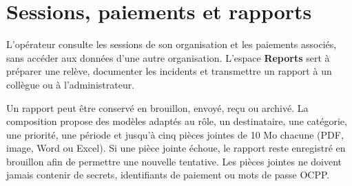 \section{Sessions, paiements et rapports}

L'opérateur consulte les sessions de son organisation et les paiements associés,
sans accéder aux données d'une autre organisation. L'espace \textbf{Reports}
sert à préparer une relève, documenter les incidents et transmettre un rapport
à un collègue ou à l'administrateur.


Un rapport peut être conservé en brouillon, envoyé, reçu ou archivé. La
composition propose des modèles adaptés au rôle, un destinataire, une catégorie,
une priorité, une période et jusqu'à cinq pièces jointes de 10 Mo chacune (PDF,
image, Word ou Excel). Si une pièce jointe échoue, le rapport reste enregistré
en brouillon afin de permettre une nouvelle tentative. Les pièces jointes ne
doivent jamais contenir de secrets, identifiants de paiement ou mots de passe
OCPP.
